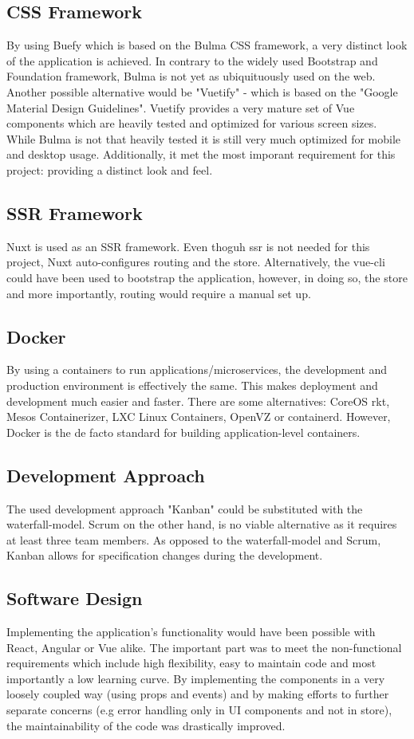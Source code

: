 \subsection{CSS Framework}
By using Buefy which is based on the Bulma CSS framework, a very distinct look of the application is achieved. In contrary to the widely used Bootstrap and Foundation framework, Bulma is not yet as ubiquituously used on the web. Another possible alternative would be "Vuetify" - which is based on the "Google Material Design Guidelines". Vuetify provides a very mature set of Vue components which are heavily tested and optimized for various screen sizes. While Bulma is not that heavily tested it is still very much optimized for mobile and desktop usage. Additionally, it met the most imporant requirement for this project: providing a distinct look and feel. 

\subsection{SSR Framework}
Nuxt is used as an SSR framework. Even thoguh \acrshort{ssr} is not needed for this project, Nuxt auto-configures routing and the store. Alternatively, the vue-cli could have been used to bootstrap the application, however, in doing so, the store and more importantly, routing would require a manual set up.

\subsection{Docker}
By using a containers to run applications/microservices, the development and production environment is effectively the same. This makes deployment and development much easier and faster. There are some alternatives: CoreOS rkt, Mesos Containerizer, LXC Linux Containers, OpenVZ or containerd. However, Docker is the de facto standard for building application-level containers. 

\subsection{Development Approach}
The used development approach "Kanban" could be substituted with the waterfall-model. Scrum on the other hand, is no viable alternative as it requires at least three team members. As opposed to the waterfall-model and Scrum, Kanban allows for specification changes during the development. 

\subsection{Software Design}
Implementing the application's functionality would have been possible with React, Angular or Vue alike. The important part was to meet the non-functional requirements which include high flexibility, easy to maintain code and most importantly a low learning curve. By implementing the components in a very loosely coupled way (using props and events) and by making efforts to further separate concerns (e.g error handling only in UI components and not in store), the maintainability of the code was drastically improved.

